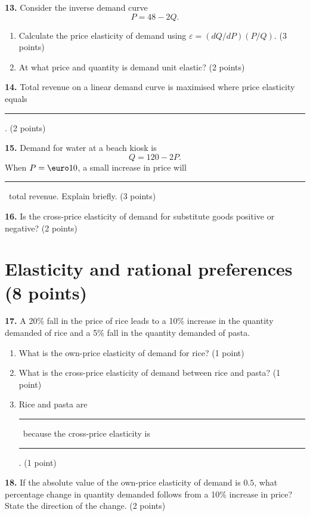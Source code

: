 \documentclass[11pt,a4paper]{article}
\newcommand{\answerline}{\rule{0.42\textwidth}{0.35pt}}
\begin{document}
\vspace{0.6em}
\textbf{13.} Consider the inverse demand curve
\[
P=48-2Q.
\]
\begin{enumerate}[label=\textbf{\alph*.}]
  \item Calculate the price elasticity of demand using
        \(\varepsilon=(dQ/dP)(P/Q)\). \hfill (3 points)
  \item At what price and quantity is demand unit elastic?
        \hfill (2 points)
\end{enumerate}

\vspace{0.45em}
\textbf{14.} Total revenue on a linear demand curve is maximised where price
elasticity equals \answerline. \hfill (2 points)

\vspace{0.45em}
\textbf{15.} Demand for water at a beach kiosk is
\[
Q=120-2P.
\]
When \(P=\text{\euro}10\), a small increase in price will
\answerline\ total revenue. Explain briefly. \hfill (3 points)

\vspace{0.45em}
\textbf{16.} Is the cross-price elasticity of demand for substitute goods
positive or negative? \hfill (2 points)

\vfill
\newpage
\section{Elasticity and rational preferences \hfill (8 points)}

\textbf{17.} A 20\% fall in the price of rice leads to a 10\% increase in the
quantity demanded of rice and a 5\% fall in the quantity demanded of pasta.

\begin{enumerate}[label=\textbf{\alph*.}]
  \item What is the own-price elasticity of demand for rice? \hfill (1 point)
  \item What is the cross-price elasticity of demand between rice and pasta?
        \hfill (1 point)
  \item Rice and pasta are \answerline\ because the cross-price elasticity is
        \answerline. \hfill (1 point)
\end{enumerate}

\vspace{0.7em}
\textbf{18.} If the absolute value of the own-price elasticity of demand is
\(0.5\), what percentage change in quantity demanded follows from a 10\%
increase in price? State the direction of the change. \hfill (2 points)
\end{document}
